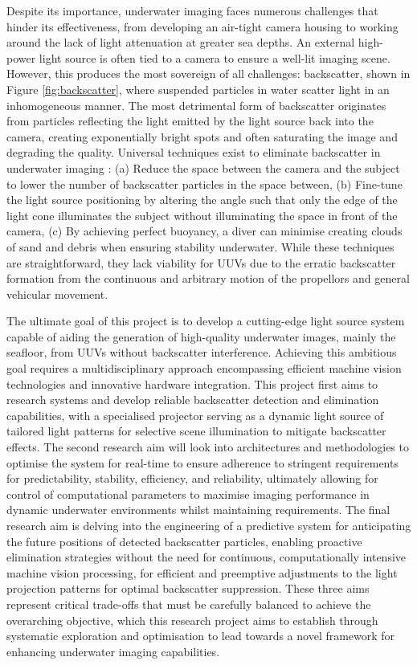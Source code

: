 Despite its importance, underwater imaging faces numerous challenges that hinder its effectiveness, from developing an air-tight camera housing to working around the lack of light attenuation at greater sea depths. An external high-power light source is often tied to a camera to ensure a well-lit imaging scene. However, this produces the most sovereign of all challenges: backscatter, shown in Figure \ref{fig:backscatter}, where suspended particles in water scatter light in an inhomogeneous manner. The most detrimental form of backscatter originates from particles reflecting the light emitted by the light source back into the camera, creating exponentially bright spots and often saturating the image and degrading the quality. Universal techniques exist to eliminate backscatter in underwater imaging \cite{brentdurandEasyWaysEliminate2013}: (a) Reduce the space between the camera and the subject to lower the number of backscatter particles in the space between, (b) Fine-tune the light source positioning by altering the angle such that only the edge of the light cone illuminates the subject without illuminating the space in front of the camera, (c) By achieving perfect buoyancy, a diver can minimise creating clouds of sand and debris when ensuring stability underwater. While these techniques are straightforward, they lack viability for UUVs due to the erratic backscatter formation from the continuous and arbitrary motion of the propellors and general vehicular movement.

The ultimate goal of this project is to develop a cutting-edge light source system capable of aiding the generation of high-quality underwater images, mainly the seafloor, from UUVs without backscatter interference. Achieving this ambitious goal requires a multidisciplinary approach encompassing efficient machine vision technologies and innovative hardware integration. This project first aims to research systems and develop reliable backscatter detection and elimination capabilities, with a specialised projector serving as a dynamic light source of tailored light patterns for selective scene illumination to mitigate backscatter effects. The second research aim will look into architectures and methodologies to optimise the system for real-time to ensure adherence to stringent requirements for predictability, stability, efficiency, and reliability, ultimately allowing for control of computational parameters to maximise imaging performance in dynamic underwater environments whilst maintaining requirements. The final research aim is delving into the engineering of a predictive system for anticipating the future positions of detected backscatter particles, enabling proactive elimination strategies without the need for continuous, computationally intensive machine vision processing, for efficient and preemptive adjustments to the light projection patterns for optimal backscatter suppression. These three aims represent critical trade-offs that must be carefully balanced to achieve the overarching objective, which this research project aims to establish through systematic exploration and optimisation to lead towards a novel framework for enhancing underwater imaging capabilities.
